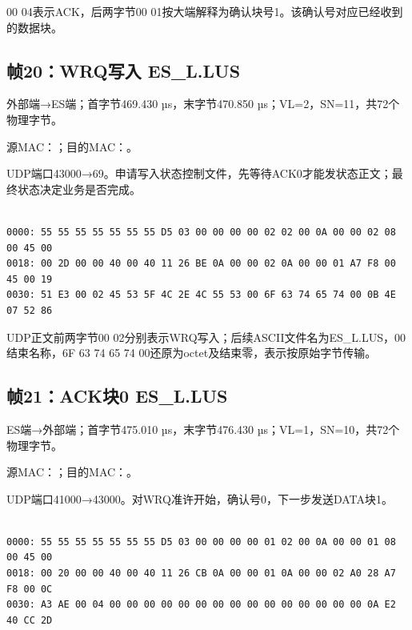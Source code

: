 00 04表示ACK，后两字节00 01按大端解释为确认块号1。该确认号对应已经收到的数据块。

\subsection*{帧20：WRQ写入 ES\_L.LUS}

外部端→ES端；首字节469.430 µs，末字节470.850 µs；VL=2，SN=11，共72个物理字节。

源MAC：；目的MAC：。

UDP端口43000→69。申请写入状态控制文件，先等待ACK0才能发状态正文；最终状态决定业务是否完成。

\par\noindent\begin{minipage}{\linewidth}
\begin{lstlisting}[caption={帧20物理字节，偏移0000--0047}]

0000: 55 55 55 55 55 55 55 D5 03 00 00 00 00 02 02 00 0A 00 00 02 08 00 45 00
0018: 00 2D 00 00 40 00 40 11 26 BE 0A 00 00 02 0A 00 00 01 A7 F8 00 45 00 19
0030: 51 E3 00 02 45 53 5F 4C 2E 4C 55 53 00 6F 63 74 65 74 00 0B 4E 07 52 86

\end{lstlisting}
\end{minipage}\par

UDP正文前两字节00 02分别表示WRQ写入；后续ASCII文件名为ES\_L.LUS，00结束名称，6F 63 74 65 74 00还原为octet及结束零，表示按原始字节传输。

\subsection*{帧21：ACK块0 ES\_L.LUS}

ES端→外部端；首字节475.010 µs，末字节476.430 µs；VL=1，SN=10，共72个物理字节。

源MAC：；目的MAC：。

UDP端口41000→43000。对WRQ准许开始，确认号0，下一步发送DATA块1。

\par\noindent\begin{minipage}{\linewidth}
\begin{lstlisting}[caption={帧21物理字节，偏移0000--0047}]

0000: 55 55 55 55 55 55 55 D5 03 00 00 00 00 01 02 00 0A 00 00 01 08 00 45 00
0018: 00 20 00 00 40 00 40 11 26 CB 0A 00 00 01 0A 00 00 02 A0 28 A7 F8 00 0C
0030: A3 AE 00 04 00 00 00 00 00 00 00 00 00 00 00 00 00 00 00 0A E2 40 CC 2D

\end{lstlisting}
\end{minipage}\par

